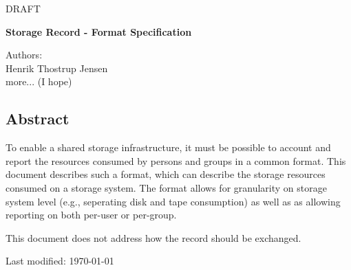 
\huge{DRAFT}

\vspace{1cm}

{\Large \bf Storage Record - Format Specification}

\vspace{1.5cm}

\large{Authors:\\
Henrik Thostrup Jensen\\
more... (I hope)
}

\vspace{0.5cm}

\subsection*{Abstract}

To enable a shared storage infrastructure, it must be possible to account and
report the resources consumed by persons and groups in a common format. This
document describes such a format, which can describe the storage resources
consumed on a storage system. The format allows for granularity on storage
system level (e.g., seperating disk and tape consumption) as well as as
allowing reporting on both per-user or per-group.

\vspace{.5cm}

\noindent
This document does not address how the record should be exchanged.


\vspace{2cm}

Last modified: \today

